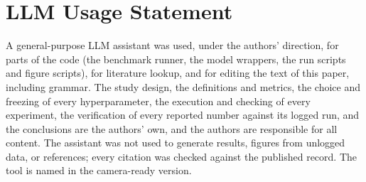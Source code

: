 \documentclass[10pt,twocolumn,letterpaper]{article}
\begin{document}
\section*{LLM Usage Statement}
A general-purpose LLM assistant was used, under the authors' direction, for parts of the code (the benchmark runner, the model wrappers, the run scripts and figure scripts), for literature lookup, and for editing the text of this paper, including grammar. The study design, the definitions and metrics, the choice and freezing of every hyperparameter, the execution and checking of every experiment, the verification of every reported number against its logged run, and the conclusions are the authors' own, and the authors are responsible for all content. The assistant was not used to generate results, figures from unlogged data, or references; every citation was checked against the published record. The tool is named in the camera-ready version.

{\small


}
\end{document}

